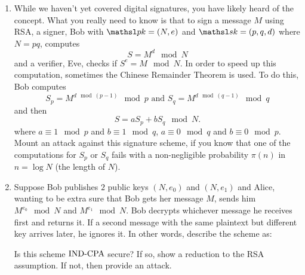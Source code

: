 \begin{enumerate}[label=\textbf{Exercise \thesection.\arabic*}, wide=0pt]
  \item While we haven't yet covered digital signatures, you have likely heard of the concept. What you really need to know is that to sign a message $M$ using RSA, a signer, Bob with $\pk = (N, e)$ and $\sk = (p, q, d)$ where $N = pq$, computes 
  \[
  S = M^d \mod N
  \]
  and a verifier, Eve, checks if $S^e = M\mod N$. In order to speed up this computation, sometimes the Chinese Remainder Theorem is used. To do this, Bob computes
  \[
  S_p = M^{d\mod (p-1)} \mod p \text{ and } S_q = M^{d\mod (q-1)} \mod q
  \]
  and then 
  \[
  S = aS_p + bS_q \mod N.
  \]
  where $a \equiv 1\mod p$ and $b \equiv 1 \mod q$, $a \equiv 0\mod q$ and $b \equiv 0 \mod p$.
  Mount an attack against this signature scheme, if you know that one of the computations for $S_p$ or $S_q$ fails with a non-negligible probability $\pi(n)$ in $n = \log N$ (the length of $N$). 
  \item Suppose Bob publishes $2$ public keys $(N, e_0)$ and $(N, e_1)$ and Alice, wanting to be extra sure that Bob gets her message $M$, sends him $M^{e_0}\mod N$ and $M^{e_1}\mod N$. Bob decrypts whichever message he receives first and returns it. If a second message with the same plaintext but different key arrives later, he ignores it. In other words, describe the scheme as:
  \begin{center}
\end{center} 
Is this scheme $\textnormal{IND-CPA}$ secure? If so, show a reduction to the RSA assumption. If not, then provide an attack.
  
\end{enumerate}


%
%
%
%

